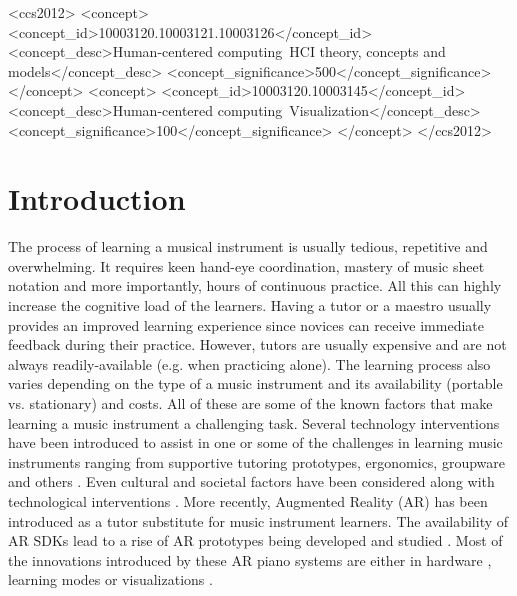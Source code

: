 \documentclass[manuscript,screen]{acmart}
\begin{document}
\begin{CCSXML}
<ccs2012>
   <concept>
       <concept_id>10003120.10003121.10003126</concept_id>
       <concept_desc>Human-centered computing~HCI theory, concepts and models</concept_desc>
       <concept_significance>500</concept_significance>
       </concept>
   <concept>
       <concept_id>10003120.10003145</concept_id>
       <concept_desc>Human-centered computing~Visualization</concept_desc>
       <concept_significance>100</concept_significance>
       </concept>
 </ccs2012>
\end{CCSXML}
\maketitle

\section{Introduction}
The process of learning a musical instrument is usually tedious, repetitive and overwhelming. It requires keen hand-eye coordination, mastery of music sheet notation and more importantly, hours of continuous practice. All this can highly increase the cognitive load of the learners. Having a tutor or a maestro usually provides an improved learning experience since novices can receive immediate feedback during their practice. However, tutors are usually expensive and are not always readily-available (e.g. when practicing alone). The learning process also varies depending on the type of a music instrument and its availability (portable vs. stationary) and costs. All of these are some of the known factors that make learning a music instrument a challenging task.
Several technology interventions have been introduced to assist in one or some of the challenges in learning music instruments ranging from supportive tutoring prototypes, ergonomics, groupware and others \cite{fober2007vemus, daniel2006exploring}. Even cultural and societal factors have been considered along with technological interventions \cite{creech2010learning, cope1997cultural}. More recently, Augmented Reality (AR) has been introduced as a tutor substitute for music instrument learners. The availability of AR SDKs lead to a rise of AR prototypes being developed and studied \cite{santos2013augmented}. Most of the innovations introduced by these AR piano systems are either in hardware \cite{barakonyi2005augmented, huang2011piano}, learning modes \cite{rogers2014piano} or visualizations \cite{chow2013music}. 
\end{document}
